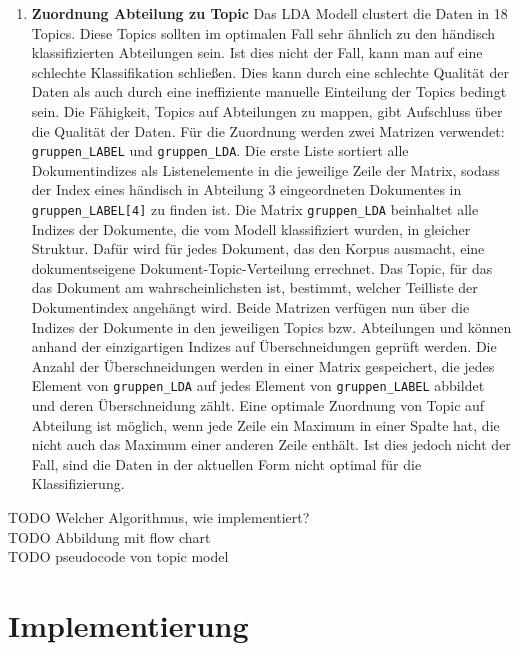 \documentclass[german,version-2020-11]{uzl-thesis}
\begin{document}
\begin{enumerate}
\item \textbf{Zuordnung Abteilung zu Topic}
Das LDA Modell clustert die Daten in 18 Topics. Diese Topics sollten im optimalen Fall sehr ähnlich zu den händisch klassifizierten Abteilungen sein. Ist dies nicht der Fall, kann man auf eine schlechte Klassifikation schließen. Dies kann durch eine schlechte Qualität der Daten als auch durch eine ineffiziente manuelle Einteilung der Topics bedingt sein. Die Fähigkeit, Topics auf Abteilungen zu mappen, gibt Aufschluss über die Qualität der Daten. Für die Zuordnung werden zwei Matrizen verwendet: \lstinline{gruppen_LABEL} und \lstinline{gruppen_LDA}. Die erste Liste sortiert alle Dokumentindizes als Listenelemente in die jeweilige Zeile der Matrix, sodass der Index eines händisch in Abteilung 3 eingeordneten Dokumentes in \lstinline{gruppen_LABEL[4]} zu finden ist. Die Matrix \lstinline{gruppen_LDA} beinhaltet alle Indizes der Dokumente, die vom Modell klassifiziert wurden, in gleicher Struktur. Dafür wird für jedes Dokument, das den Korpus ausmacht, eine dokumentseigene Dokument-Topic-Verteilung errechnet. Das Topic, für das das Dokument am wahrscheinlichsten ist, bestimmt, welcher Teilliste der Dokumentindex angehängt wird. Beide Matrizen verfügen nun über die Indizes der Dokumente in den jeweiligen Topics bzw. Abteilungen und können anhand der einzigartigen Indizes auf Überschneidungen geprüft werden. Die Anzahl der Überschneidungen werden in einer Matrix gespeichert, die jedes Element von \lstinline{gruppen_LDA} auf jedes Element von \lstinline{gruppen_LABEL} abbildet und deren Überschneidung zählt. Eine optimale Zuordnung von Topic auf Abteilung ist möglich, wenn jede Zeile ein Maximum in einer Spalte hat, die nicht auch das Maximum einer anderen Zeile enthält. Ist dies jedoch nicht der Fall, sind die Daten in der aktuellen Form nicht optimal für die Klassifizierung. 
\end{enumerate}

TODO Welcher Algorithmus, wie implementiert? \\
TODO Abbildung mit flow chart\\
TODO pseudocode von topic model


\chapter{Implementierung}%
\end{document}
